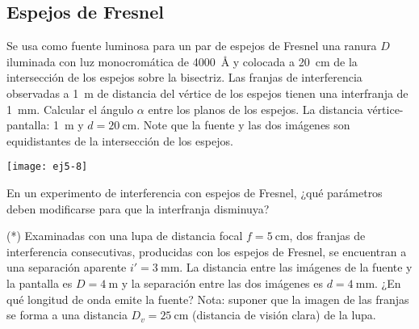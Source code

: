 \subsection*{Espejos de Fresnel}

\item 
\begin{minipage}[t][4.2cm]{0.6\textwidth}
Se usa como fuente luminosa para un par de espejos de Fresnel una ranura $D$ iluminada con luz monocromática de \SI{4000}{\angstrom} y colocada a \SI{20}{\centi\metre} de la intersección de los espejos sobre la bisectriz.
Las franjas de interferencia observadas a \SI{1}{\metre}  de distancia del vértice de los espejos tienen una interfranja de \SI{1}{\milli\metre}.
Calcular el ángulo $\alpha$ entre los planos de los espejos.
La distancia vértice-pantalla: \SI{1}{\metre} y $d = \SI{20}{\centi\metre}$.
Note que la fuente y las dos imágenes son equidistantes de la intersección de los espejos. 
\end{minipage}
\begin{minipage}[c][0cm][t]{0.35\textwidth}
	\texttt{[image: ej5-8]}
\end{minipage}



\item En un experimento de interferencia con espejos de Fresnel, ¿qué parámetros deben modificarse para que la interfranja disminuya?



\item (*) Examinadas con una lupa de distancia focal $f = \SI{5}{\centi\metre}$, dos franjas de interferencia consecutivas, producidas con los espejos de Fresnel, se encuentran a una separación aparente $i' = \SI{3}{\milli\metre}$.
	La distancia entre las imágenes de la fuente y la pantalla es $D = \SI{4}{\metre}$ y la separación entre las dos imágenes es $d = \SI{4}{\milli\metre}$.
	¿En qué longitud de onda emite la fuente?
	Nota: suponer que la imagen de las franjas se forma a una distancia $D_v = \SI{25}{\centi\metre}$ (distancia de visión clara) de la lupa.
